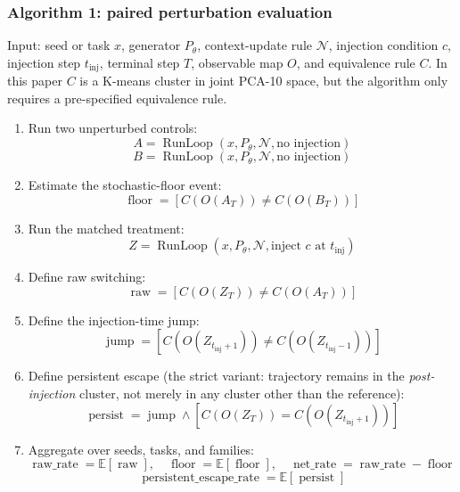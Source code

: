 \documentclass{article}
\theoremstyle{plain}
\theoremstyle{definition}
\begin{document}
\subsubsection*{Algorithm 1: paired perturbation evaluation}

Input: seed or task \(x\), generator \(P_\theta\), context-update rule \(\mathcal{N}\), injection condition \(c\), injection step \(t_{\mathrm{inj}}\), terminal step \(T\), observable map \(O\), and equivalence rule \(C\). In this paper \(C\) is a K-means cluster in joint PCA-10 space, but the algorithm only requires a pre-specified equivalence rule.

\begin{enumerate}
  \item Run two unperturbed controls:
   \[A=\operatorname{RunLoop}(x,P_\theta,\mathcal{N},\text{no injection})\]
   \[B=\operatorname{RunLoop}(x,P_\theta,\mathcal{N},\text{no injection})\]

  \item Estimate the stochastic-floor event:
   \[\operatorname{floor}=\left[C(O(A_T))\neq C(O(B_T))\right]\]

  \item Run the matched treatment:
   \[Z=\operatorname{RunLoop}(x,P_\theta,\mathcal{N},\text{inject }c\text{ at }t_{\mathrm{inj}})\]

  \item Define raw switching:
   \[\operatorname{raw}=\left[C(O(Z_T))\neq C(O(A_T))\right]\]

  \item Define the injection-time jump:
   \[\operatorname{jump}=\left[C(O(Z_{t_{\mathrm{inj}}+1}))\neq C(O(Z_{t_{\mathrm{inj}}-1}))\right]\]

  \item Define persistent escape (the strict variant: trajectory remains in the \textit{post-injection} cluster, not merely in any cluster other than the reference):
   \[\operatorname{persist}=\operatorname{jump}\wedge
   \left[C(O(Z_T))=C(O(Z_{t_{\mathrm{inj}}+1}))\right]\]

  \item Aggregate over seeds, tasks, and families:
   \[\operatorname{raw\_rate}=\mathbb{E}[\operatorname{raw}],\quad
   \operatorname{floor}=\mathbb{E}[\operatorname{floor}],\quad
   \operatorname{net\_rate}=\operatorname{raw\_rate}-\operatorname{floor}\]
   \[\operatorname{persistent\_escape\_rate}=\mathbb{E}[\operatorname{persist}]\]
\end{enumerate}
\end{document}
